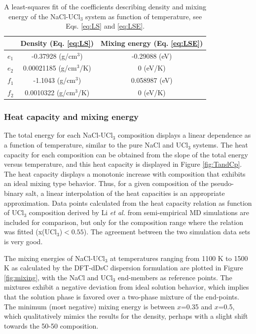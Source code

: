 \documentclass[preprint,3p,10pt,onecolumn,number,sort&compress]{elsarticle}
\begin{document}
\begin{table}[hb!]
\centering
{\color{red}
\begin{tabular}{lcc}
\hline
\hline
&Density (Eq. \ref{eq:LS}) &Mixing energy (Eq. \ref{eq:LSE}) \\
\hline
$e_1$ &-0.37928 (g/cm$^3$) &-0.29088 (eV) \\
$e_2$ &0.00021185 (g/cm$^3$/K) &0 (eV/K)\\
$f_1$ &-1.1043 (g/cm$^3$) &0.058987 (eV) \\
$f_2$ &0.0010322 (g/cm$^3$/K) &0 (eV/K)\\
\hline
\hline
\end{tabular}
}
\caption{A least-squares fit of the coefficients describing density and mixing energy of the NaCl-UCl$_3$ system as function of temperature, see Eqs. \ref{eq:LS} and \ref{eq:LSE}.}
\label{table:LS}
\end{table}

\FloatBarrier

\subsubsection{Heat capacity and mixing energy}
The total energy for each NaCl-UCl$_3$ composition displays a linear dependence as a function of temperature, similar to the pure NaCl and UCl$_3$ systems. The heat capacity for each composition can be obtained from the slope of the total energy versus temperature, and this heat capacity is displayed in Figure \ref{fig:TandCp}. The heat capacity displays a monotonic increase with composition that exhibits an ideal mixing type behavior. Thus, for a given composition of the pseudo-binary salt, a linear interpolation of the heat capacities is an appropriate approximation. {\color{red}Data points calculated from the heat capacity relation as function of UCl$_3$ composition derived by Li \textit{et al.} \cite{Li2020} from semi-empirical MD simulations are included for comparison, but only for the composition range where the relation was fitted (x(UCl$_3$)$<0.55$). The agreement between the two simulation data sets is very good.}

The mixing energies of NaCl-UCl$_3$ at temperatures ranging from 1100 K to 1500 K as calculated by the DFT-dDsC dispersion formulation are plotted in Figure \ref{fig:mixing}, with the NaCl and UCl$_3$ end-members as reference points. The mixtures exhibit a negative deviation from ideal solution behavior, which implies that the solution phase is favored over a two-phase mixture of the end-points. 
 The minimum (most negative) mixing energy is between $x$=0.35 and $x$=0.5, which qualitatively mimics the results for the density, perhaps with a slight shift towards the 50-50 composition. 
  
\end{document}
